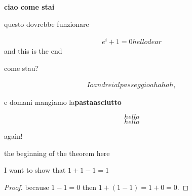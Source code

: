 \textbf{ciao come stai}

questo dovrebbe funzionare

\begin{align*}
e^i+1=0 hello dear
\end{align*}
and this is the end

come stau?

\begin{align}
Io andrei al passeggio ahahah,
\end{align}

e domani mangiamo la\textbf{pastaasciutto}

\begin{equation} hello \end{equation}
\begin{equation*} hello \end{equation*}

again! \centering

the beginning of the theorem {\Large here}
\begin{theorem}
I want to show that $1+1-1 = 1$
\end{theorem}
\begin{proof}
because $1-1=0$ then $1+(1-1)=1+0=0.$
\end{proof}
